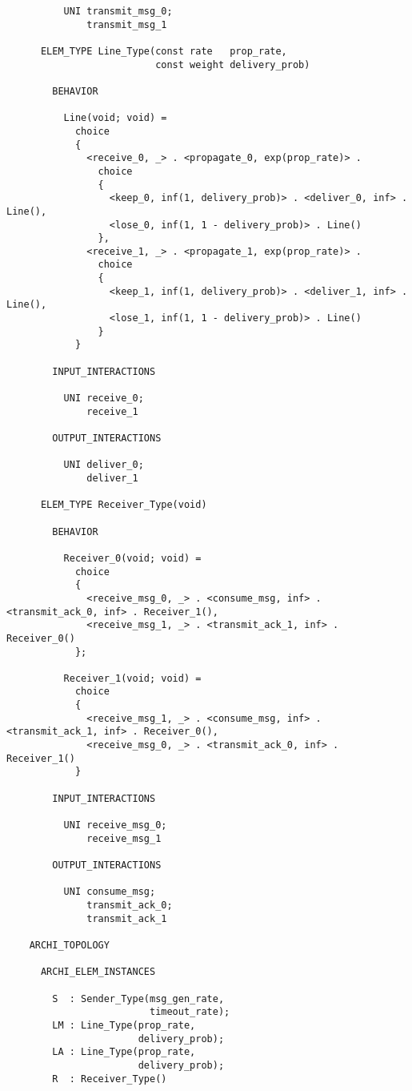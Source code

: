 \begin{verbatim}
          UNI transmit_msg_0;
              transmit_msg_1

      ELEM_TYPE Line_Type(const rate   prop_rate,
                          const weight delivery_prob)

        BEHAVIOR

          Line(void; void) =
            choice
            {
              <receive_0, _> . <propagate_0, exp(prop_rate)> .
                choice
                {
                  <keep_0, inf(1, delivery_prob)> . <deliver_0, inf> . Line(),
                  <lose_0, inf(1, 1 - delivery_prob)> . Line()
                },
              <receive_1, _> . <propagate_1, exp(prop_rate)> .
                choice
                {
                  <keep_1, inf(1, delivery_prob)> . <deliver_1, inf> . Line(),
                  <lose_1, inf(1, 1 - delivery_prob)> . Line()
                }
            }

        INPUT_INTERACTIONS

          UNI receive_0;
              receive_1

        OUTPUT_INTERACTIONS

          UNI deliver_0;
              deliver_1

      ELEM_TYPE Receiver_Type(void)

        BEHAVIOR

          Receiver_0(void; void) =
            choice
            {
              <receive_msg_0, _> . <consume_msg, inf> . <transmit_ack_0, inf> . Receiver_1(),
              <receive_msg_1, _> . <transmit_ack_1, inf> . Receiver_0()
            };

          Receiver_1(void; void) =
            choice
            {
              <receive_msg_1, _> . <consume_msg, inf> . <transmit_ack_1, inf> . Receiver_0(),
              <receive_msg_0, _> . <transmit_ack_0, inf> . Receiver_1()
            }

        INPUT_INTERACTIONS

          UNI receive_msg_0;
              receive_msg_1

        OUTPUT_INTERACTIONS

          UNI consume_msg;
              transmit_ack_0;
              transmit_ack_1

    ARCHI_TOPOLOGY

      ARCHI_ELEM_INSTANCES

        S  : Sender_Type(msg_gen_rate,
                         timeout_rate);
        LM : Line_Type(prop_rate,
                       delivery_prob);
        LA : Line_Type(prop_rate,
                       delivery_prob);
        R  : Receiver_Type()


\end{verbatim}
